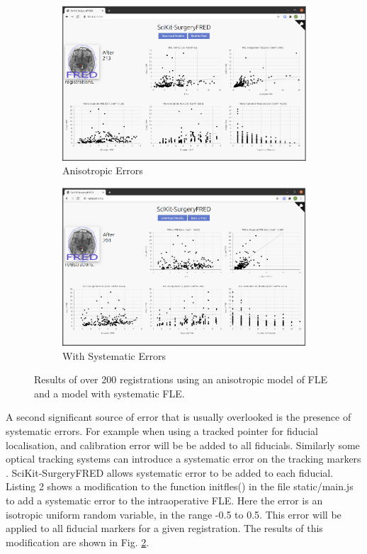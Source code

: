 \begin{figure}
	\begin{center}
		\begin{subfigure}[b]{0.48\linewidth}
			\includegraphics[width=\linewidth]{images/anisitropic_error.eps}
			\caption{\label{fig:anis_error}Anisotropic Errors}
		\end{subfigure}
		\begin{subfigure}[b]{0.48\linewidth}
			\includegraphics[width=\linewidth]{images/systematic_error.eps}
			\caption{\label{fig:sys_error}With Systematic Errors}
		\end{subfigure}
		\caption{\label{fig:other_errors}Results of over 200 registrations using an anisotropic model of {FLE} and a model with systematic {FLE}.}
	\end{center}
\end{figure}

A second significant source of error that is usually overlooked is the presence of systematic errors. For example when using a tracked pointer for fiducial localisation, and calibration error will be be added to all fiducials. Similarly some optical tracking systems can introduce a systematic error on the tracking markers \cite{6294449}. {SciKit-SurgeryFRED} allows systematic error to be added to each fiducial. Listing 2 shows 
a modification to the function init{\textunderscore}fles() in the file {static/main.js} to add a systematic error to the 
intraoperative {FLE}. Here the error is an isotropic uniform random variable, in the range -0.5 to 0.5. This error will be applied to all fiducial markers for a given registration. The results of this modification are shown in Fig. \ref{fig:sys_error}.

